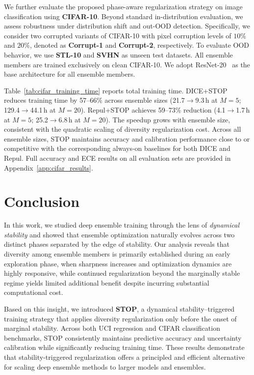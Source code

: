 \documentclass[sigconf]{acmart}
\begin{document}
We further evaluate the proposed phase-aware regularization strategy on image classification using \textbf{CIFAR-10}.
Beyond standard in-distribution evaluation, we assess robustness under distribution shift and out-OOD detection. Specifically, we consider two corrupted variants of CIFAR-10 with pixel corruption levels of $10\%$ and $20\%$, denoted as \textbf{Corrupt-1} and \textbf{Corrupt-2}, respectively. To evaluate OOD behavior, we use \textbf{STL-10} and \textbf{SVHN} as unseen test datasets.
All ensemble members are trained exclusively on clean CIFAR-10. We adopt ResNet-20~\citep{he2016deep} as the base architecture for all ensemble members.

Table~\ref{tab:cifar_training_time} reports total training time. DICE+STOP reduces training time by 57--66\% across ensemble sizes (21.7$\to$9.3\,h at $M=5$; 129.4$\to$44.1\,h at $M=20$). Repul+STOP achieves 59--73\% reduction (4.1$\to$1.7\,h at $M=5$; 25.2$\to$6.8\,h at $M=20$). The speedup grows with ensemble size, consistent with the quadratic scaling of diversity regularization cost. Across all ensemble sizes, STOP maintains accuracy and calibration performance close to or competitive with the corresponding always-on baselines for both DICE and Repul. Full accuracy and ECE results on all evaluation sets are provided in Appendix~\ref{app:cifar_results}.




\section{Conclusion}
\label{sec:conclusion}

In this work, we studied deep ensemble training through the lens of \emph{dynamical stability} and showed that ensemble optimization naturally evolves across two distinct phases separated by the edge of stability. Our analysis reveals that diversity among ensemble members is primarily established during an early exploration phase, when sharpness increases and optimization dynamics are highly responsive, while continued regularization beyond the marginally stable regime yields limited additional benefit despite incurring substantial computational cost.

Based on this insight, we introduced \textbf{STOP}, a dynamical stability–triggered training strategy that applies diversity regularization only before the onset of marginal stability. Across both UCI regression and CIFAR classification benchmarks, STOP consistently maintains predictive accuracy and uncertainty calibration while significantly reducing training time. These results demonstrate that stability-triggered regularization offers a principled and efficient alternative for scaling deep ensemble methods to larger models and ensembles.
\end{document}
